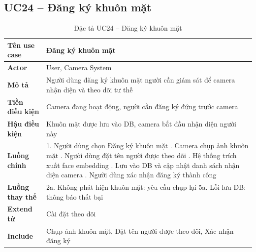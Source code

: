 \subsection*{UC24 -- Đăng ký khuôn mặt}
\begin{table}[H]
    \captionsetup{justification=raggedright, singlelinecheck=false}
    \caption{Đặc tả UC24 -- Đăng ký khuôn mặt}
\centering
\begin{tabular}{|p{3.5cm}|p{10cm}|}
\hline
\textbf{Tên use case} & Đăng ký khuôn mặt \\
\hline
\textbf{Actor} & User, Camera System \\
\hline
\textbf{Mô tả} & Người dùng đăng ký khuôn mặt người cần
  giám sát để camera nhận diện và theo dõi tư thế \\
\hline
\textbf{Tiền điều kiện} & Camera đang hoạt động, người
  cần đăng ký đứng trước camera \\
\hline
\textbf{Hậu điều kiện} & Khuôn mặt được lưu vào DB,
  camera bắt đầu nhận diện người này \\
\hline
\textbf{Luồng chính} &
  1. Người dùng chọn Đăng ký khuôn mặt \newline
  2. Camera chụp ảnh khuôn mặt \newline
  3. Người dùng đặt tên người được theo dõi \newline
  4. Hệ thống trích xuất face embedding \newline
  5. Lưu vào DB và cập nhật danh sách nhận diện camera \newline
  6. Người dùng xác nhận đăng ký thành công \\
\hline
\textbf{Luồng thay thế} &
  2a. Không phát hiện khuôn mặt: yêu cầu chụp lại \newline
  5a. Lỗi lưu DB: thông báo thất bại \\
\hline
\textbf{Extend từ} & Cài đặt theo dõi \\
\hline
\textbf{Include} & Chụp ảnh khuôn mặt, Đặt tên người
  được theo dõi, Xác nhận đăng ký \\
\hline
\end{tabular}

\end{table}

